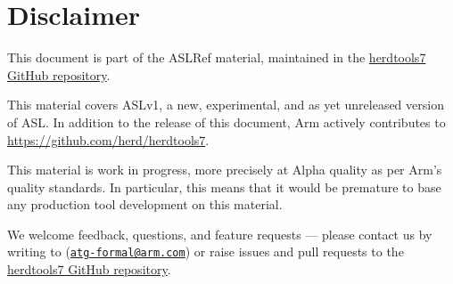 \chapter{Disclaimer}

This document is part of the ASLRef material, maintained in the
\href{https://github.com/herd/herdtools7}{herdtools7 GitHub repository}.

This material covers ASLv1, a new, experimental, and as yet unreleased version of ASL.
In addition to the release of this document, Arm actively contributes to
\url{https://github.com/herd/herdtools7}.

This material is work in progress, more precisely at Alpha quality as
per Arm’s quality standards. In particular, this means that it would be
premature to base any production tool development on this material.

We welcome feedback, questions, and feature requests — please contact us by writing
to (\href{mailto:atg-formal@arm.com}{\tt atg-formal@arm.com}) or raise issues and
pull requests to the \href{https://github.com/herd/herdtools7}{herdtools7 GitHub repository}.

